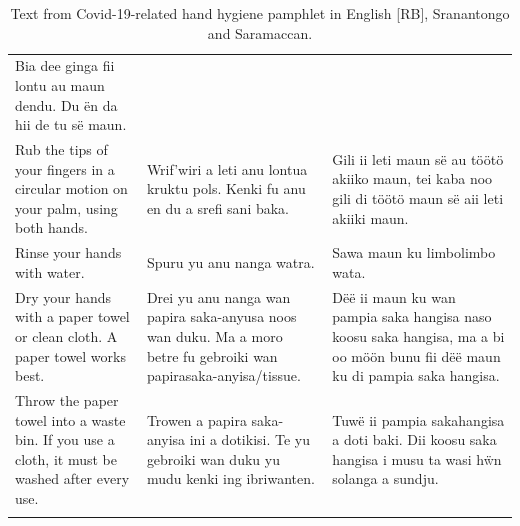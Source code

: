\begin{longtable}{ p{}p{}p{} }
        Bia dee ginga fii lontu au maun dendu. Du ën da hii de tu së maun.                \\
        Rub the tips of your fingers in a circular motion on your palm, using both hands. &
        Wrif'wiri a leti anu lontua kruktu pols. Kenki fu anu en du a srefi sani baka.                       &
        Gili ii leti maun së au töötö akiiko maun, tei kaba noo gili di töötö maun së aii leti akiiki maun.  \\
        Rinse your hands with water.   &
        Spuru yu anu nanga watra.      &
        Sawa maun ku limbolimbo wata.  \\
        Dry your hands with a paper towel or clean cloth. A paper towel works best.                                                   &
        Drei yu anu nanga wan papira saka-anyusa noos wan duku. Ma a moro betre fu gebroiki wan papirasaka-anyisa/tissue.             &
        Dëë ii maun ku wan pampia saka hangisa naso koosu saka hangisa, ma a bi oo möön bunu fii dëë maun ku di pampia saka hangisa.  \\
        Throw the paper towel into a waste bin. If you use a cloth, it must be washed after every use.      &
        Trowen a papira saka-anyisa ini a dotikisi. Te yu gebroiki wan duku yu mudu kenki ing ibriwanten.   &
        Tuwë ii pampia sakahangisa a doti baki. Dii koosu saka hangisa i musu ta wasi hẅn solanga a sundju. \\
    \hline
    \caption{Text from Covid-19-related hand hygiene pamphlet in English [RB], Sranantongo and Saramaccan.}
    \end{longtable}

